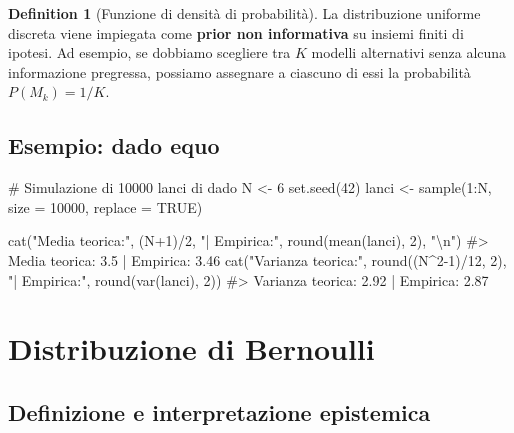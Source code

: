 \documentclass[
  letterpaper,
  DIV=11,
  numbers=noendperiod,
  oneside]{scrreprt}
\newenvironment{Shaded}{\begin{snugshade}}{\end{snugshade}}
\newcommand{\AttributeTok}[1]{\textcolor[rgb]{0.40,0.45,0.13}{#1}}
\newcommand{\CommentTok}[1]{\textcolor[rgb]{0.37,0.37,0.37}{#1}}
\newcommand{\ConstantTok}[1]{\textcolor[rgb]{0.56,0.35,0.01}{#1}}
\newcommand{\DecValTok}[1]{\textcolor[rgb]{0.68,0.00,0.00}{#1}}
\newcommand{\FunctionTok}[1]{\textcolor[rgb]{0.28,0.35,0.67}{#1}}
\newcommand{\NormalTok}[1]{\textcolor[rgb]{0.00,0.23,0.31}{#1}}
\newcommand{\OtherTok}[1]{\textcolor[rgb]{0.00,0.23,0.31}{#1}}
\newcommand{\SpecialCharTok}[1]{\textcolor[rgb]{0.37,0.37,0.37}{#1}}
\newcommand{\StringTok}[1]{\textcolor[rgb]{0.13,0.47,0.30}{#1}}
\theoremstyle{definition}
\theoremstyle{plain}
\theoremstyle{definition}
\newtheorem{definition}{Definition}[chapter]
\theoremstyle{remark}
\begin{document}
\begin{definition}[Funzione di densità di
probabilità]
La distribuzione uniforme discreta viene impiegata come \textbf{prior
non informativa} su insiemi finiti di ipotesi. Ad esempio, se dobbiamo
scegliere tra \(K\) modelli alternativi senza alcuna informazione
pregressa, possiamo assegnare a ciascuno di essi la probabilità
\(P(M_k) = 1/K\).

\subsection{Esempio: dado equo}\label{esempio-dado-equo}

\begin{Shaded}
\begin{Highlighting}[]
\CommentTok{\# Simulazione di 10000 lanci di dado}
\NormalTok{N }\OtherTok{\textless{}{-}} \DecValTok{6}
\FunctionTok{set.seed}\NormalTok{(}\DecValTok{42}\NormalTok{)}
\NormalTok{lanci }\OtherTok{\textless{}{-}} \FunctionTok{sample}\NormalTok{(}\DecValTok{1}\SpecialCharTok{:}\NormalTok{N, }\AttributeTok{size =} \DecValTok{10000}\NormalTok{, }\AttributeTok{replace =} \ConstantTok{TRUE}\NormalTok{)}

\FunctionTok{cat}\NormalTok{(}\StringTok{"Media teorica:"}\NormalTok{, (N}\SpecialCharTok{+}\DecValTok{1}\NormalTok{)}\SpecialCharTok{/}\DecValTok{2}\NormalTok{, }\StringTok{"| Empirica:"}\NormalTok{, }\FunctionTok{round}\NormalTok{(}\FunctionTok{mean}\NormalTok{(lanci), }\DecValTok{2}\NormalTok{), }\StringTok{"}\SpecialCharTok{\textbackslash{}n}\StringTok{"}\NormalTok{)}
\CommentTok{\#\textgreater{} Media teorica: 3.5 | Empirica: 3.46}
\FunctionTok{cat}\NormalTok{(}\StringTok{"Varianza teorica:"}\NormalTok{, }\FunctionTok{round}\NormalTok{((N}\SpecialCharTok{\^{}}\DecValTok{2{-}1}\NormalTok{)}\SpecialCharTok{/}\DecValTok{12}\NormalTok{, }\DecValTok{2}\NormalTok{), }\StringTok{"| Empirica:"}\NormalTok{, }\FunctionTok{round}\NormalTok{(}\FunctionTok{var}\NormalTok{(lanci), }\DecValTok{2}\NormalTok{))}
\CommentTok{\#\textgreater{} Varianza teorica: 2.92 | Empirica: 2.87}
\end{Highlighting}
\end{Shaded}

\section{Distribuzione di Bernoulli}\label{distribuzione-di-bernoulli}

\subsection{Definizione e interpretazione
epistemica}\label{definizione-e-interpretazione-epistemica-2}


\end{definition}
\end{document}
